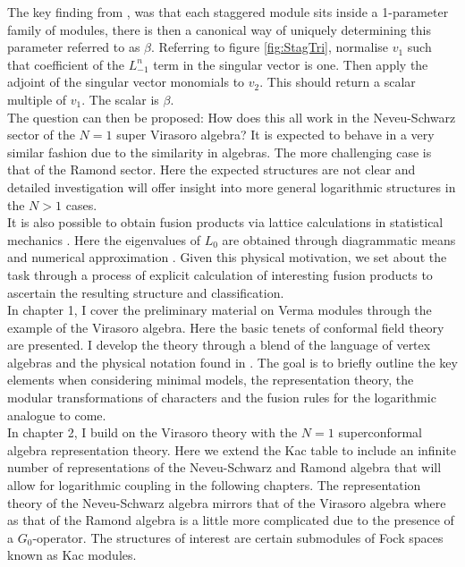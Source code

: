 \documentclass[a4paper,reqno,12pt]{report}
\theoremstyle{definition}
\numberwithin{equation}{section}
\theoremstyle{plain}
\begin{document}
The key finding from \cite{RidStag09}, was that each staggered module sits inside a 1-parameter family of modules, there is then a canonical way of uniquely determining this parameter referred to as $\beta$. Referring to figure \ref{fig:StagTri}, normalise $v_1$ such that coefficient of the $L_{-1}^n$ term in the singular vector is one. Then apply the adjoint of the singular vector monomials to $v_2$. This should return a scalar multiple of $v_1$. The scalar is $\beta$.\\ 

The question can then be proposed: How does this all work in the Neveu-Schwarz sector of the $N=1$ super Virasoro algebra? It is expected to behave in a very similar fashion due to the similarity in algebras. The more challenging case is that of the Ramond sector. Here the expected structures are not clear and detailed investigation will offer insight into more general logarithmic structures in the $N>1$ cases. \\

It is also possible to obtain fusion products via lattice calculations in statistical mechanics \cite{PeaRasLog06,ReaAss07}. Here the eigenvalues of $L_0$ are obtained through diagrammatic means and numerical approximation \cite{CarInv86}. Given this physical motivation, we set about the task through a process of explicit calculation of interesting fusion products to ascertain the resulting structure and classification.\\

In chapter 1, I cover the preliminary material on Verma modules through the example of the Virasoro algebra. Here the basic tenets of conformal field theory are presented. I develop the theory through a blend of the language of vertex algebras and the physical notation found in \cite{MatCFT97}. The goal is to briefly outline the key elements when considering minimal models, the representation theory, the modular transformations of characters and the fusion rules for the logarithmic analogue to come.\\

In chapter 2, I build on the Virasoro theory with the $N=1$ superconformal algebra representation theory. Here we extend the Kac table to include an infinite number of representations of the Neveu-Schwarz and Ramond algebra that will allow for logarithmic coupling in the following chapters. The representation theory of the Neveu-Schwarz algebra mirrors that of the Virasoro algebra where as that of the Ramond algebra is a little more complicated due to the presence of a $G_0$-operator. The structures of interest are certain submodules of Fock spaces known as Kac modules. \\
\end{document}
